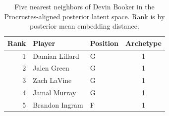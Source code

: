 \begin{table}[htbp]
  \centering\small
  \begin{tabular}{rllc}
    \toprule
    Rank & Player & Position & Archetype \\
    \midrule
    1 & Damian Lillard & G & 1 \\
    2 & Jalen Green & G & 1 \\
    3 & Zach LaVine & G & 1 \\
    4 & Jamal Murray & G & 1 \\
    5 & Brandon Ingram & F & 1 \\
    \bottomrule
  \end{tabular}
  \caption{Five nearest neighbors of Devin Booker in the Procrustes-aligned posterior latent space. Rank is by posterior mean embedding distance.}
  \label{tab:Devin_Booker_neighbors}
\end{table}

